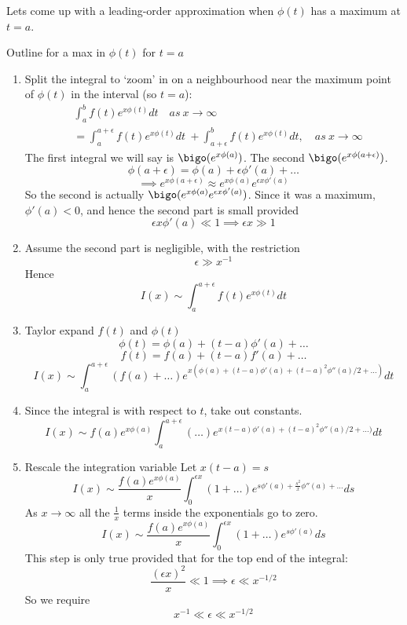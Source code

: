 \documentclass{X:/Documents/Coding/Latex/myassignment}
\begin{document}
Lets come up with a leading-order approximation when $\phi(t)$ has a maximum at $t=a$.


Outline for a max in $\phi(t)$ for $t=a$
\begin{enumerate}
    \item Split the integral to `zoom' in on a neighbourhood near the maximum point of $\phi(t)$ in the interval (so $t=a$):
    \begin{align*}
        &\int_a^b f(t) e^{x\phi(t)} dt\quad as \ x\to \infty\\
        &= \int_a^{a+\epsilon}  f(t) e^{x\phi(t)} dt \ + \int_{a+\epsilon}^b  f(t) e^{x\phi(t)} dt, \quad as \ x \to\infty     
    \end{align*}
    The first integral we will say is $\bigo(e^{x\phi(a)})$. The second $\bigo(e^{x\phi(a+\epsilon)})$.
    \[\phi(a+\epsilon) = \phi(a) + \epsilon \phi'(a) +\ldots\]
    \[\implies e^{x\phi(a+\epsilon)} \approx e^{x\phi(a)} e^{\epsilon x\phi'(a)}\]
    So the second is actually $\bigo(e^{x\phi(a)} e^{\epsilon x\phi'(a)})$. Since it was a maximum, $\phi'(a) < 0$, and hence the second part is small provided
    \[\epsilon x \phi'(a) \ll 1 \implies \epsilon x \gg 1\]
    \item Assume the second part is negligible, with the restriction 
    \[\epsilon \gg x^{-1}\]
    Hence
    \[I(x) \sim \int_a^{a+\epsilon} f(t) e^{x\phi(t)} dt\]

    \item Taylor expand $f(t)$ and $\phi(t)$
    \[\phi(t) = \phi(a) + (t-a) \phi'(a) + \ldots\]
    \[f(t) = f(a) + (t-a) f'(a) + \ldots\]
    \[I(x) \sim \int_a^{a+\epsilon} \left(f(a) + \ldots\right)e^{x(\phi(a) + (t-a) \phi'(a) + (t-a)^2 \phi''(a)/2 +\ldots)} dt\]
    \item Since the integral is with respect to $t$, take out constants.
    \[I(x) \sim f(a)e^{x\phi(a)}\int_a^{a+\epsilon} \left(\ldots\right)e^{x(t-a) \phi'(a) + (t-a)^2 \phi''(a)/2 +\ldots)} dt\]
    \item Rescale the integration variable
    Let $x(t-a) = s$
    \[I(x) \sim \frac{f(a) e^{x\phi(a)}}{x} \int_0^{\epsilon x}(1 +\ldots) e^{s\phi'(a) + \frac{s^2}{x} \phi''(a) + \ldots} ds \]
    As $x\to\infty$ all the $\frac{1}{x}$ terms inside the exponentials go to zero.
    \[I(x) \sim \frac{f(a) e^{x\phi(a)}}{x} \int_0^{\epsilon x}(1 +\ldots) e^{s\phi'(a)} ds \]
    This step is only true provided that for the top end of the integral: 
    \[\frac{(\epsilon x)^2}{x} \ll 1 \implies \epsilon \ll x^{-1/2}\]
    So we require 
    \[x^{-1} \ll \epsilon \ll x^{-1/2}\]


\end{enumerate}
\end{document}
